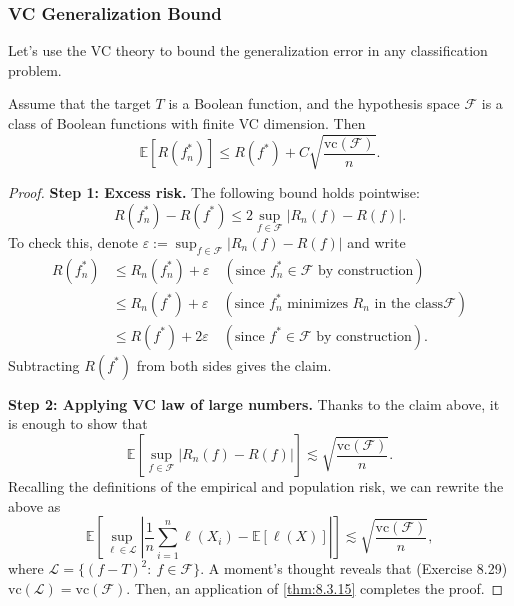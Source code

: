 \subsubsection{VC Generalization Bound}
Let's use the VC theory to bound the generalization error in any classification problem.

\begin{theorem}
\label{thm:8.4.5}
Assume that the target $T$ is a Boolean function, and the hypothesis space $\mathcal{F}$ is a class of 
Boolean functions with finite VC dimension. Then 
\[ \mathbb{E}\left[ R(f_n^*) \right] \leq R(f^*) + C \sqrt{\frac{\mathrm{vc}(\mathcal{F})}{n}}. \]
\end{theorem}

\begin{proof}
\textbf{Step 1: Excess risk.} The following bound holds pointwise:
\[ R(f_n^*) - R(f^*) \leq 2 \sup_{f \in \mathcal{F}}|R_n(f) - R(f)|. \]
To check this, denote $\varepsilon := \sup_{f \in \mathcal{F}}|R_n(f) - R(f)|$ and write 
\begin{align*}
	R(f_n^*) 
	&\leq R_n(f_n^*) + \varepsilon \quad (\text{since } f_n^* \in \mathcal{F} \text{ by construction}) \\
	&\leq R_n(f^*) + \varepsilon \quad (\text{since } f_n^* \text{ minimizes } R_n \text{ in the class} 
	\mathcal{F}) \\
	&\leq R(f^*) + 2 \varepsilon \quad (\text{since } f^* \in \mathcal{F} \text{ by construction}).
\end{align*}
Subtracting $R(f^*)$ from both sides gives the claim.

\textbf{Step 2: Applying VC law of large numbers.} Thanks to the claim above, it is enough to show that 
\[ \mathbb{E}\left[ \sup_{f \in \mathcal{F}}|R_n(f) - R(f)| \right] \lesssim 
\sqrt{\frac{\mathrm{vc}(\mathcal{F})}{n}}. \]
Recalling the definitions of the empirical and population risk, we can rewrite the above as
\[ \mathbb{E}\left[ \sup_{\ell \in \mathcal{L}} \left| \frac{1}{n}\sum_{i = 1}^{n} \ell(X_i) 
- \mathbb{E}\left[ \ell(X) \right] \right| \right] \lesssim \sqrt{\frac{\mathrm{vc}(\mathcal{F})}{n}}, \]
where $\mathcal{L} = \{ (f - T)^2: \ f \in \mathcal{F} \}$. A moment's thought reveals that (Exercise 8.29) 
$\mathrm{vc}(\mathcal{L}) = \mathrm{vc}(\mathcal{F})$. Then, an application of \cref{thm:8.3.15} completes 
the proof.
\end{proof}

